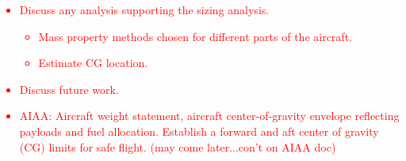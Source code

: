 \textcolor{red}{
\begin{itemize}
    \item Discuss any analysis supporting the sizing analysis.
    \begin{itemize}
        \item Mass property methods chosen for different parts of the aircraft.
        \item Estimate CG location.
    \end{itemize}
    \item Discuss future work.
    \item AIAA: Aircraft weight statement, aircraft center-of-gravity envelope reflecting payloads and fuel allocation. Establish a forward and aft center of gravity (CG) limits for safe flight. (may come later...con't on AIAA doc)
\end{itemize}}